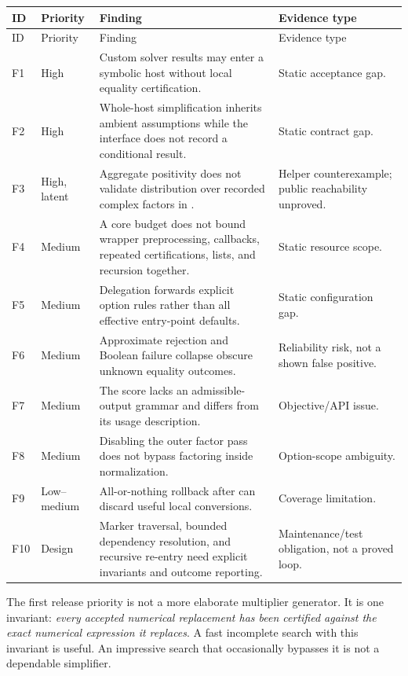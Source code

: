 \documentclass[11pt,letterpaper]{article}
\numberwithin{equation}{section}
\theoremstyle{definition}\newtheorem{definition}[theorem]{Definition}
\theoremstyle{remark}\newtheorem{remark}[theorem]{Remark}
\newcommand{\code}[1]{\texttt{\detokenize{#1}}}
\begin{document}
\begingroup\small
\begin{longtable}{@{}p{}p{}p{}p{}@{}}
\toprule ID & Priority & Finding & Evidence type\\\midrule\endfirsthead
\toprule ID & Priority & Finding & Evidence type\\\midrule\endhead
\bottomrule\endfoot
F1 & High & Custom solver results may enter a symbolic host without local equality certification. & Static acceptance gap.\\[4pt]
F2 & High & Whole-host simplification inherits ambient assumptions while the interface does not record a conditional result. & Static contract gap.\\[4pt]
F3 & High, latent & Aggregate positivity does not validate distribution over recorded complex factors in \code{combine}. & Helper counterexample; public reachability unproved.\\[4pt]
F4 & Medium & A core budget does not bound wrapper preprocessing, callbacks, repeated certifications, lists, and recursion together. & Static resource scope.\\[4pt]
F5 & Medium & Delegation forwards explicit option rules rather than all effective entry-point defaults. & Static configuration gap.\\[4pt]
F6 & Medium & Approximate rejection and Boolean failure collapse obscure unknown equality outcomes. & Reliability risk, not a shown false positive.\\[4pt]
F7 & Medium & The score lacks an admissible-output grammar and differs from its usage description. & Objective/API issue.\\[4pt]
F8 & Medium & Disabling the outer factor pass does not bypass factoring inside normalization. & Option-scope ambiguity.\\[4pt]
F9 & Low--medium & All-or-nothing rollback after \code{ToRadicals} can discard useful local conversions. & Coverage limitation.\\[4pt]
F10 & Design & Marker traversal, bounded dependency resolution, and recursive re-entry need explicit invariants and outcome reporting. & Maintenance/test obligation, not a proved loop.\\
\end{longtable}
\endgroup

The first release priority is not a more elaborate multiplier generator. It is one invariant: \emph{every accepted numerical replacement has been certified against the exact numerical expression it replaces}. A fast incomplete search with this invariant is useful. An impressive search that occasionally bypasses it is not a dependable simplifier.
\end{document}
